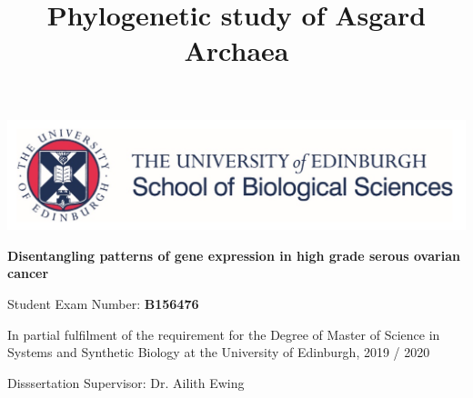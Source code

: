 \documentclass[draft, tikz, 12pt,a4paper,oneside,fleqn]{article}
\title{Phylogenetic study of Asgard Archaea}
\author{}
\begin{document}
\begin{center}
\includegraphics[scale=0.3]{images/UoE_SBO_logo.png}
\end{center}

\vspace{0.3in}

\begin{mdframed}
\begin{center}
\huge
\vspace{0.3in}
\bf
Disentangling patterns of gene expression in high grade serous ovarian cancer
\vspace{0.2in}
\end{center}
\vspace{0.2in}
\end{mdframed}

\vspace{0.3in}

\begin{mdframed}
\begin{center}
\large
\vspace{0.2in}
Student Exam Number: \bf{B156476}
\vspace{0.2in}
\end{center}
\end{mdframed}

\vspace{0.3in}

\begin{mdframed}
\begin{center}
\large
\vspace{0.2in}
In partial fulfilment of the requirement for the Degree of
Master of Science in Systems and Synthetic Biology at the
University of Edinburgh,
2019 / 2020
\vspace{0.2in}
\end{center}
\end{mdframed}

\vspace{0.3in}

\begin{mdframed}
\begin{center}
\large
\vspace{0.2in}

Disssertation Supervisor:  Dr. Ailith Ewing
\vspace{0.2in}
\end{center}
\end{mdframed}
\end{document}
